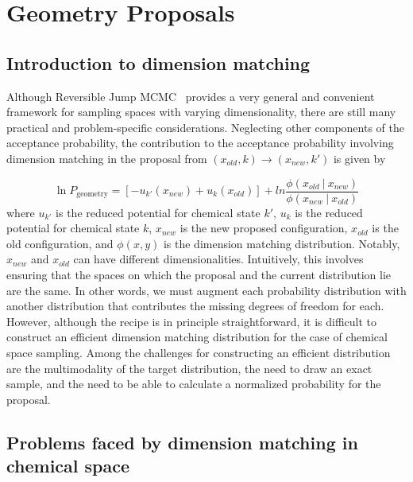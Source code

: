 \chapter{Geometry Proposals}

\section{Introduction to dimension matching}

Although Reversible Jump MCMC~\cite{GREEN1995} provides a very general and convenient framework for sampling spaces with varying dimensionality, there are still many practical and problem-specific considerations.
%
Neglecting other components of the acceptance probability, the contribution to the acceptance probability involving dimension matching in the proposal from $(x_{old}, k) \rightarrow (x_{new}, k')$ is given by

\begin{equation} \label{eq:geometry}
    \ln P_\mathrm{geometry} = \left[-u_{k'}(x_{new}) + u_{k}(x_{old})\right] + ln\frac{\phi (x_{old}~|~x_{new})}{\phi (x_{new}~|~x_{old})}
\end{equation}
%
where $u_{k'}$ is the reduced potential for chemical state $k'$, $u_k$ is the reduced potential for chemical state $k$, $x_{new}$ is the new proposed configuration, $x_{old}$ is the old configuration, and $\phi(x,y)$ is the dimension matching distribution.
%
Notably, $x_{new}$ and $x_{old}$ can have different dimensionalities.
%
Intuitively, this involves ensuring that the spaces on which the proposal and the current distribution lie are the same.
%
In other words, we must augment each probability distribution with another distribution that contributes the missing degrees of freedom for each.
%
However, although the recipe is in principle straightforward, it is difficult to construct an efficient dimension matching distribution for the case of chemical space sampling.
%
Among the challenges for constructing an efficient distribution are the multimodality of the target distribution, the need to draw an exact sample, and the need to be able to calculate a normalized probability for the proposal.
%
\section{Problems faced by dimension matching in chemical space}
%
